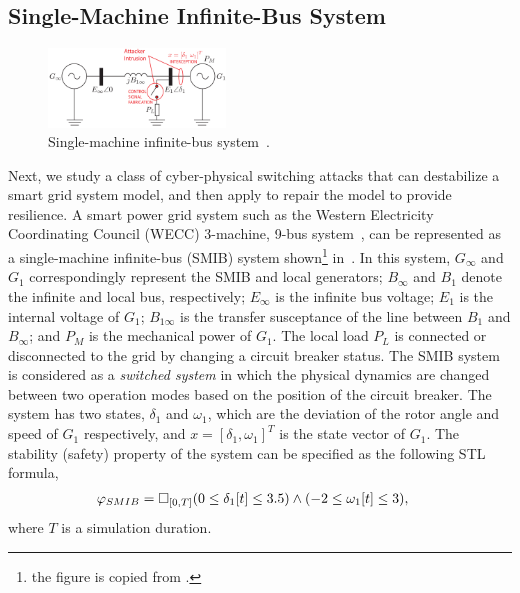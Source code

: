 \subsection{Single-Machine Infinite-Bus System}
%
\begin{figure}[t!]%
	\centering%
    \includegraphics[width=0.42\textwidth]{image/smib}%
	\caption{Single-machine infinite-bus system~\cite{farraj2014practical}.}%
	\vspace{-1em}
\end{figure}%
Next, we study a class of cyber-physical switching attacks that can destabilize a smart grid system model, and then apply \toolreaffirm to repair the model to provide resilience. A smart power grid system such as the Western Electricity Coordinating Council (WECC) 3-machine, 9-bus system~\cite{sauer1998power}, can be represented as a single-machine infinite-bus (SMIB) system shown\footnote{the figure is copied from \cite{farraj2014practical}.} in~. In this system, $G_\infty$ and $G_1$ correspondingly represent the SMIB and local generators; $B_\infty$ and $B_1$ denote the infinite and local bus, respectively; $E_\infty$ is the infinite bus voltage; $E_1$ is the internal voltage of $G_1$; $B_{1\infty}$ is the transfer susceptance of the line between $B_1$ and $B_\infty$; and $P_M$ is the mechanical power of $G_1$. The local load $P_L$ is connected or disconnected to the grid by changing a circuit breaker status. The SMIB system is considered as a \emph{switched system} in which the physical dynamics are changed between two operation modes based on the position of the circuit breaker. The system has two states, $\delta_1$ and $\omega_1$, which are the deviation of the rotor angle and speed of $G_1$ respectively, and $x = [\delta_1,\omega_1]^T$ is the state vector of $G_1$.
%
The stability (safety) property of the system can be specified as the following STL formula,
%
\begin{align}
\vspace{-1em}
	\varphi_{SMIB} & = \Box_{[0, T]} (0 \leq \delta_1[t] \leq 3.5) \wedge (-2 \leq \omega_1[t] \leq 3),\formlabel{smib_stl}
		\vspace{-1em}
\end{align}
where $T$ is a simulation duration.

